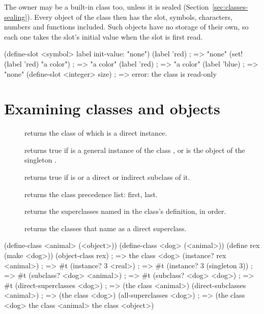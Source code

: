 The owner may be a built-in class too, unless it is sealed
(Section~\ref{sec:classes-sealing}). Every object of the class then has
the slot, symbols, characters, numbers and functions included. Such
objects have no storage of their own, so each one takes the slot's initial
value when the slot is first read.

\begin{dylan}
(define-slot <symbol> label init-value: "none")
(label 'red)                   ; => "none"
(set! (label 'red) "a color")  ; => "a color"
(label 'red)                   ; => "a color"
(label 'blue)                  ; => "none"
(define-slot <integer> size)   ; => error: the class is read-only
\end{dylan}

\section{Examining classes and objects}\label{sec:classes-reflection}

\begin{description}
\item[]
  returns the class of which  is a direct instance.
\item[]
  returns true if  is a general instance of the class
  , or is the object of the singleton .
\item[]
  returns true if  is  or a direct or indirect
  subclass of it.
\item[]
  returns the class precedence list:  first, 
  last.
\item[]
  returns the superclasses named in the class's definition, in order.
\item[]
  returns the classes that name  as a direct superclass.
\end{description}

\begin{dylan}
(define-class <animal> (<object>))
(define-class <dog> (<animal>))
(define rex (make <dog>))
(object-class rex)             ; => {the class <dog>}
(instance? rex <animal>)       ; => #t
(instance? 3 <real>)           ; => #t
(instance? 3 (singleton 3))    ; => #t
(subclass? <dog> <animal>)     ; => #t
(subclass? <dog> <dog>)        ; => #t
(direct-superclasses <dog>)    ; => ({the class <animal>})
(direct-subclasses <animal>)   ; => ({the class <dog>})
(all-superclasses <dog>)
  ; => ({the class <dog>} {the class <animal>} {the class <object>})
\end{dylan}

